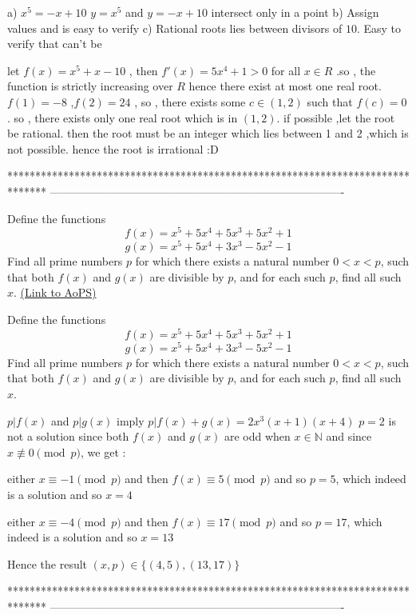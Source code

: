 \begin{solution}
	a) $x^5=-x+10$
$y=x^5$ and $y=-x+10$ intersect  only in a point
b) Assign values and is easy to verify
c) Rational roots lies between divisors of $10$. Easy to verify that can't be
\end{solution}



\begin{solution}
	let $f(x)=x^5+x-10$ , then $f '(x)=5x^4+1>0$ for all $x \in R$ .so , the function is strictly increasing over $R$
hence there exist at most one real root. $f(1)=-8$ ,$f(2)=24$ , so , there exists some $c \in (1,2) $ such that        $f(c)=0$. so , there exists only one real root which is in $(1,2)$. if possible ,let the root be rational. then the root must be an integer which lies between 1 and 2  ,which is not possible. hence the root is irrational :D  
\end{solution}
*******************************************************************************
-------------------------------------------------------------------------------

\begin{problem}
	Define the functions \[ f(x) = x^5+5x^4+5x^3+5x^2+1\] \[g(x) =x^5+5x^4+3x^3-5x^2-1\] 
Find all prime numbers $p$ for which there exists a natural number $ 0 < x < p $, such that both $f(x)$ and $g(x)$ are divisible by $p$, and for each such $p$, find all such $x$.
	\flushright \href{https://artofproblemsolving.com/community/c6h476005}{(Link to AoPS)}
\end{problem}



\begin{solution}
	\begin{tcolorbox}Define the functions \[ f(x) = x^5+5x^4+5x^3+5x^2+1\] \[g(x) =x^5+5x^4+3x^3-5x^2-1\] 
Find all prime numbers $p$ for which there exists a natural number $ 0 < x < p $, such that both $f(x)$ and $g(x)$ are divisible by $p$, and for each such $p$, find all such $x$.\end{tcolorbox}
$p|f(x)$ and $p|g(x)$ imply $p|f(x)+g(x)=2x^3(x+1)(x+4)$ 
$p=2$ is not a solution since both $f(x)$ and $g(x)$ are odd when $x\in\mathbb N$ and since $x\not\equiv 0\pmod p$, we get :

either $x\equiv -1\pmod p$ and then $f(x)\equiv 5\pmod p$ and so $p=5$, which indeed is a solution and so $x=4$

either $x\equiv -4\pmod p$ and then $f(x)\equiv 17\pmod p$ and so $p=17$, which indeed is a solution and so $x=13$

Hence the result $\boxed{(x,p)\in\{(4,5),(13,17)\}}$
\end{solution}
*******************************************************************************
-------------------------------------------------------------------------------

